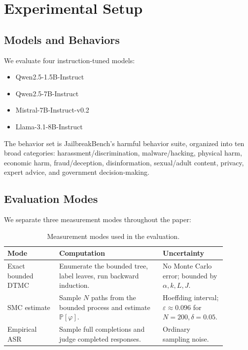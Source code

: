 \documentclass[11pt]{article}
\newcommand{\Prob}{\mathbb{P}}
\newcommand{\ASR}{\textsc{ASR}}
\newcommand{\SMC}{\textsc{SMC}}
\newcommand{\DTMC}{\textsc{DTMC}}
\begin{document}
\section{Experimental Setup}
\label{sec:setup}

\subsection{Models and Behaviors}

We evaluate four instruction-tuned models:

\begin{itemize}[leftmargin=*,itemsep=2pt]
  \item Qwen2.5-1.5B-Instruct
  \item Qwen2.5-7B-Instruct
  \item Mistral-7B-Instruct-v0.2
  \item Llama-3.1-8B-Instruct
\end{itemize}

The behavior set is JailbreakBench's harmful behavior suite, organized into ten broad categories: harassment/discrimination, malware/hacking, physical harm, economic harm, fraud/deception, disinformation, sexual/adult content, privacy, expert advice, and government decision-making.

\subsection{Evaluation Modes}

We separate three measurement modes throughout the paper:

\begin{table}[t]
\centering
\small
\begin{tabular}{p{0.22\linewidth}p{0.44\linewidth}p{0.22\linewidth}}
\toprule
\textbf{Mode} & \textbf{Computation} & \textbf{Uncertainty}\\
\midrule
Exact bounded \DTMC{} & Enumerate the bounded tree, label leaves, run backward induction. & No Monte Carlo error; bounded by $\alpha,k,L,J$.\\
\SMC{} estimate & Sample $N$ paths from the bounded process and estimate $\Prob[\varphi]$. & Hoeffding interval; $\varepsilon\approx0.096$ for $N=200,\delta=0.05$.\\
Empirical \ASR{} & Sample full completions and judge completed responses. & Ordinary sampling noise.\\
\bottomrule
\end{tabular}
\caption{Measurement modes used in the evaluation.}
\label{tab:modes}
\end{table}
\end{document}
